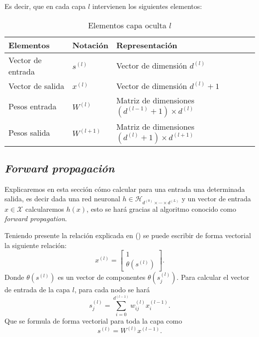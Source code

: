 Es decir, que en cada capa $l$ intervienen los siguientes elementos:  
\begin{table}[h]
    \begin{center}
    \begin{tabular}{| l | l | l |}
    \hline
    Elementos & Notación & Representación 
    \\ \hline
    Vector de entrada & $s^{(l)}$ &  Vector de dimensión $d^{(l)}$ \\
    Vector de salida & $x^{(l)}$ &  Vector de dimensión $d^{(l)}+ 1$ \\
    Pesos entrada & $W^{(l)}$ & Matriz de dimensiones $(d^{(l-1)}+1) \times d^{(l)}$ \\
    Pesos salida & $W^{(l+1)}$ 
    & Matriz de dimensiones $(d^{(l)}+1) \times d^{(l+1)}$ \\
    \hline
    \end{tabular}
    \caption{Elementos capa oculta $l$}
    \label{tab:rrnn_elementos_capa_oculta}
    \end{center}
\end{table}

\subsection{ \textit{Forward propagación}}

Explicaremos en esta sección cómo calcular para una entrada una determinada salida, es decir
dada una red neuronal $h \in \mathcal{H}_{d^{(0)} \times \cdots \times d^{(L)}}$ y un vector de entrada $x \in \mathcal{X}$ calcularemos  $h(x)$, esto se hará gracias al algoritmo conocido como \textit{forward propagation}.

Teniendo presente la relación  explicada en () se puede escribir de forma vectorial la siguiente relación: 
\begin{equation}
    x^{(l)} = 
    \left[ \begin{array}{c}
        1 \\
       \theta(s^{(l)})
        \end{array}
\right] .
\end{equation}
Donde $\theta(s^{(l)})$ es un vector de componentes $\theta(s^{(l)}_j)$. 
Para calcular el vector de entrada de la capa $l$, para cada nodo se hará
\begin{equation}
    s_j^{(l)} = \sum_{i=0}^{d^{(l-1)}} w_{i j}^{(l)}x_i^{(l-1)}.
\end{equation}
Que se formula de forma vectorial para toda la capa como 
\begin{equation}
    s^{(l)} = W^{(l)} x^{(l-1)}.
\end{equation}

